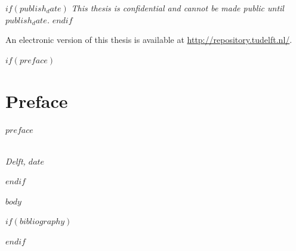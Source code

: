 \documentclass[whitelogo]{tudelft-report}
\begin{document}
\begin{titlepage}
\begin{center}
$if(publish_date)$
\bigskip
\bigskip
\emph{This thesis is confidential and cannot be made public until $publish_date$.}
$endif$

\bigskip
\bigskip
An electronic version of this thesis is available at \url{http://repository.tudelft.nl/}.



\end{center}


\end{titlepage}

$if(preface)$
\chapter*{Preface}

$preface$

\begin{flushright}
{\makeatletter\itshape
    \@author \\
    Delft, $date$
\makeatother}
\end{flushright}

$endif$

\tableofcontents

\mainmatter

$body$

\appendix

%

\nocite{*}

$if(bibliography)$

$endif$
\end{document}
